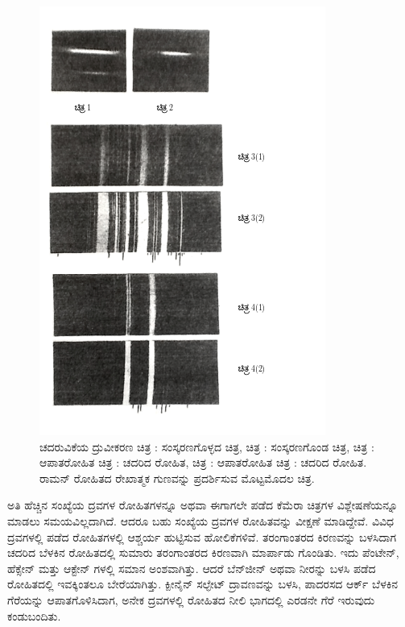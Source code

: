 \begin{figure}[!hb]
\centering
\includegraphics[scale=0.64]{"images/12.png"}
\caption{ಚದರುವಿಕೆಯ ದ್ರುವೀಕರಣ ಚಿತ್ರ \textbf{}: ಸಂಸ್ಕರಣಗೊಳ್ಳದ ಚಿತ್ರ, ಚಿತ್ರ \textbf{}: ಸಂಸ್ಕರಣಗೊಂಡ ಚಿತ್ರ, ಚಿತ್ರ \textbf{}: ಆಪಾತರೋಹಿತ ಚಿತ್ರ \textbf{}: ಚದರಿದ ರೋಹಿತ, ಚಿತ್ರ \textbf{}: ಆಪಾತರೋಹಿತ ಚಿತ್ರ \textbf{}: ಚದರಿದ ರೋಹಿತ. ರಾಮನ್ ರೋಹಿತದ ರೇಖಾತ್ಮಕ ಗುಣವನ್ನು ಪ್ರದರ್ಶಿಸುವ ಮೊಟ್ಟಮೊದಲ ಚಿತ್ರ.}\label{chap5-fig07}
\end{figure}

ಅತಿ ಹೆಚ್ಚಿನ ಸಂಖ್ಯೆಯ ದ್ರವಗಳ ರೋಹಿತಗಳನ್ನೂ ಅಥವಾ ಈಗಾಗಲೇ ಪಡೆದ ಕೆಮೆರಾ ಚಿತ್ರಗಳ ವಿಶ್ಲೇಷಣೆಯನ್ನೂ ಮಾಡಲು ಸಮಯವಿಲ್ಲದಾಗಿದೆ. ಆದರೂ ಬಹು ಸಂಖ್ಯೆಯ ದ್ರವಗಳ ರೋಹಿತವನ್ನು ವೀಕ್ಷಣೆ ಮಾಡಿದ್ದೇವೆ. ವಿವಿಧ ದ್ರವಗಳಲ್ಲಿ ಪಡೆದ ರೋಹಿತಗಳಲ್ಲಿ ಆಶ್ಚರ್ಯ ಹುಟ್ಟಿಸುವ ಹೋಲಿಕೆಗಳಿವೆ.  ತರಂಗಾಂತರದ ಕಿರಣವನ್ನು ಬಳಸಿದಾಗ ಚದರಿದ ಬೆಳಕಿನ ರೋಹಿತದಲ್ಲಿ ಸುಮಾರು  ತರಂಗಾಂತರದ ಕಿರಣವಾಗಿ ಮಾರ್ಪಾಡು ಗೊಂಡಿತು. ಇದು ಪೆಂಟೇನ್, ಹೆಕ್ಸೇನ್ ಮತ್ತು ಆಕ್ಟೇನ್ ಗಳಲ್ಲಿ ಸಮಾನ ಅಂಶವಾಗಿತ್ತು. ಆದರೆ ಬೆನ್‍ಜೀನ್ ಅಥವಾ ನೀರನ್ನು ಬಳಸಿ ಪಡೆದ ರೋಹಿತದಲ್ಲಿ ಇವಕ್ಕಿಂತಲೂ ಬೇರೆಯಾಗಿತ್ತು. ಕ್ಪೀನೈನ್ ಸಲ್ಫೇಟ್ ದ್ರಾವಣವನ್ನು ಬಳಸಿ, ಪಾದರಸದ ಆರ್ಕ್ ಬೆಳಕಿನ  ಗೆರೆಯನ್ನು ಆಪಾತಗೊಳಿಸಿದಾಗ, ಅನೇಕ ದ್ರವಗಳಲ್ಲಿ ರೋಹಿತದ ನೀಲಿ ಭಾಗದಲ್ಲಿ ಎರಡನೇ ಗೆರೆ ಇರುವುದು ಕಂಡುಬಂದಿತು.

